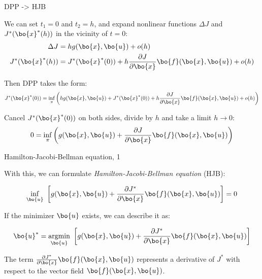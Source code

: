 \documentclass{beamer}
\begin{document}
\begin{frame}{DPP -> HJB}
	\begin{flushleft}
		
		We can set $t_1 = 0$ and $t_2 = h$, and expand nonlinear functions $\Delta J$ and $J^*(\bo{x}^*(h))$ in the vicinity of $t = 0$:
		\begin{align}
			\Delta J &= h g(\bo{x}, \bo{u}) + o(h)
			\\
			J^*(\bo{x}^*(h)) &= J^*(\bo{x}^*(0)) + h \frac{\partial J}{\partial \bo{x}} \bo{f} (\bo{x}, \bo{u}) + o(h)
		\end{align}
		
		Then DPP takes the form:
		\begin{equation}
			J^*(\bo{x}^*(0)) = \inf_\pi \left(  h g(\bo{x}, \bo{u})  +  J^*(\bo{x}^*(0)) + h \frac{\partial J}{\partial \bo{x}} \bo{f} (\bo{x}, \bo{u}) + o(h)  \right)
		\end{equation}
		
		Cancel $J^*(\bo{x}^*(0))$ on both sides, divide by $h$ and take a limit $h \rightarrow 0$:
		\begin{equation}
			0 = \inf_\pi \left( g(\bo{x}, \bo{u})  +  \frac{\partial J}{\partial \bo{x}} \bo{f} (\bo{x}, \bo{u})  \right)
		\end{equation}
		
		
	\end{flushleft}
\end{frame}



\begin{frame}{Hamilton-Jacobi-Bellman equation, 1}
\begin{flushleft}

With this, we can formulate \emph{Hamilton-Jacobi-Bellman equation} (HJB):

\begin{equation}
\label{eq:HJB_0}
\underset{\bo{u}}{\inf} \ 
\left[ 
g(\bo{x}, \bo{u}) + 
\frac{\partial J^*}{\partial \bo{x}} \bo{f} (\bo{x}, \bo{u}) 
\right] = 0
\end{equation}

\bigskip


If the minimizer $\bo{u}$ exists, we can describe it as:

\begin{equation}
\bo{u}^* = \underset{\bo{u}}{\text{argmin}} \ 
\left[ 
g(\bo{x}, \bo{u}) + 
\frac{\partial J^*}{\partial \bo{x}} \bo{f} (\bo{x}, \bo{u}) \right] 
\end{equation}

The term $\frac{\partial J^*}{\partial \bo{x}} \bo{f} (\bo{x}, \bo{u})$ represents a derivative of $J^*$ with respect to the vector field $\bo{f} (\bo{x}, \bo{u})$. 


\end{flushleft}
\end{frame}
\end{document}
